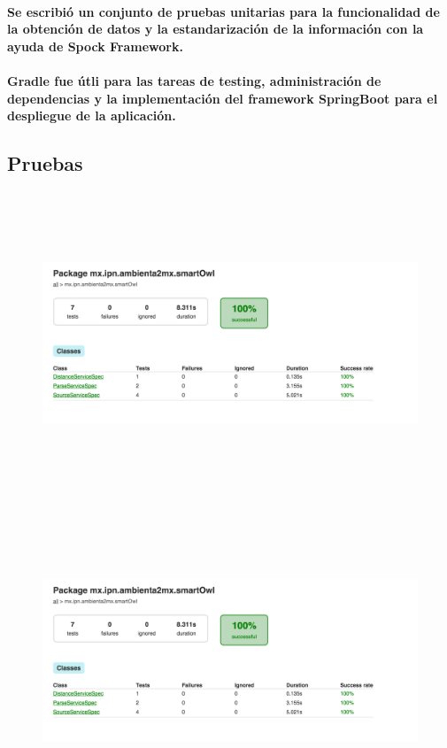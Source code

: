   \paragraph{Se escribió un conjunto de pruebas unitarias para la funcionalidad de la obtención de datos y la estandarización de la información con la ayuda de Spock Framework.}

  \paragraph{Gradle fue útli para las tareas de testing, administración de dependencias y la implementación del framework SpringBoot para el despliegue de la aplicación.}

  \subsection{Pruebas}
  \begin{figure}[b!]
      \begin{center}
        \includegraphics[width=14cm,height=9cm]{./images/prueba1}
      \end{center}
    \end{figure}
    \begin{figure}[b!]
      \begin{center}
        \includegraphics[width=14cm,height=9cm]{./images/prueba1}
      \end{center}
    \end{figure}
